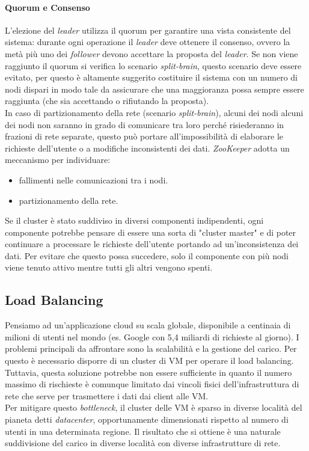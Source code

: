 \documentclass{article}
\begin{document}
\paragraph{Quorum e Consenso}
L'elezione del \textit{leader} utilizza il quorum per garantire una vista consistente del sistema: durante ogni operazione il \textit{leader} deve ottenere il consenso, ovvero la metà più uno dei \textit{follower} devono accettare la proposta del \textit{leader}. Se non viene raggiunto il quorum si verifica lo scenario \textit{split-brain}, questo scenario deve essere evitato, per questo è altamente suggerito costituire il sistema con un numero di nodi dispari in modo tale da assicurare che una maggioranza possa sempre essere raggiunta (che sia accettando o rifiutando la proposta).\\
In caso di partizionamento della rete (scenario \textit{split-brain}), alcuni dei nodi alcuni dei nodi non saranno in grado di comunicare tra loro perché risiederanno in frazioni di rete separate, questo può portare all'impossibilità di elaborare le richieste dell'utente o a modifiche inconsistenti dei dati. \textit{ZooKeeper} adotta un meccanismo per individuare:
\begin{itemize}
    \item fallimenti nelle comunicazioni tra i nodi.
    \item partizionamento della rete.
\end{itemize}
Se il cluster è stato suddiviso in diversi componenti indipendenti, ogni componente potrebbe pensare di essere una sorta di "cluster master" e di poter continuare a processare le richieste dell'utente portando ad un'inconsistenza dei dati. Per evitare che questo possa succedere, solo il componente con più nodi viene tenuto attivo mentre tutti gli altri vengono spenti.

\subsection{Load Balancing}
Pensiamo ad un'applicazione cloud su scala globale, disponibile a centinaia di milioni di utenti nel mondo (es. Google con 5,4 miliardi di richieste al giorno). I problemi principali da affrontare sono la scalabilità e la gestione del carico. Per questo è necessario disporre di un cluster di VM per operare il load balancing. Tuttavia, questa soluzione potrebbe non essere sufficiente in quanto il numero massimo di rischieste è comunque limitato dai vincoli fisici dell'infrastruttura di rete che serve per trasmettere i dati dai client alle VM.\\
Per mitigare questo \textit{bottleneck}, il cluster delle VM è sparso in diverse località del pianeta detti \textit{datacenter}, opportunamente dimensionati rispetto al numero di utenti in una determinata regione. Il risultato che si ottiene è una naturale suddivisione del carico in diverse località con diverse infrastrutture di rete.
\end{document}
